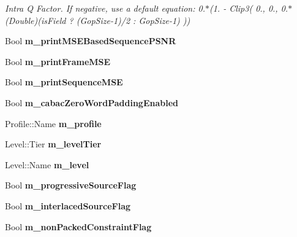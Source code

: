 \begin{DoxyCompactItemize}
\begin{DoxyCompactList}\small\item\em Intra Q Factor. If negative, use a default equation\+: 0.$\ast$(1. -\/ Clip3( 0., 0., 0.$\ast$(Double)(is\+Field ? (Gop\+Size-\/1)/2 \+: Gop\+Size-\/1) )) \end{DoxyCompactList}\item 
\mbox{\label{class_t_enc_cfg_a706af8f6f37b1627e8c57bdb467241ad}} 
Bool {\bfseries m\+\_\+print\+M\+S\+E\+Based\+Sequence\+P\+S\+NR}
\item 
\mbox{\label{class_t_enc_cfg_a29a34bed56a6a5014aa99efb80ae432b}} 
Bool {\bfseries m\+\_\+print\+Frame\+M\+SE}
\item 
\mbox{\label{class_t_enc_cfg_a08c3edbefe8945dceed4cb91ad136c43}} 
Bool {\bfseries m\+\_\+print\+Sequence\+M\+SE}
\item 
\mbox{\label{class_t_enc_cfg_a8ef0ac1fe68924828a70bf6cfa53cf46}} 
Bool {\bfseries m\+\_\+cabac\+Zero\+Word\+Padding\+Enabled}
\item 
\mbox{\label{class_t_enc_cfg_af79d35721a35c0f49fd559a11092f5c1}} 
Profile\+::\+Name {\bfseries m\+\_\+profile}
\item 
\mbox{\label{class_t_enc_cfg_a2a64d94d99cc7c77c10e814befae2acf}} 
Level\+::\+Tier {\bfseries m\+\_\+level\+Tier}
\item 
\mbox{\label{class_t_enc_cfg_aca18f9b6558678b0b6f86ac7b0e66889}} 
Level\+::\+Name {\bfseries m\+\_\+level}
\item 
\mbox{\label{class_t_enc_cfg_a4654026de446939bad95d97b935731dc}} 
Bool {\bfseries m\+\_\+progressive\+Source\+Flag}
\item 
\mbox{\label{class_t_enc_cfg_abe0e1eebbd0afeedf7e3cda2d919e5a4}} 
Bool {\bfseries m\+\_\+interlaced\+Source\+Flag}
\item 
\mbox{\label{class_t_enc_cfg_a6b9f60d2ce0ee36ccc4a766944ced8f5}} 
Bool {\bfseries m\+\_\+non\+Packed\+Constraint\+Flag}

\end{DoxyCompactItemize}
